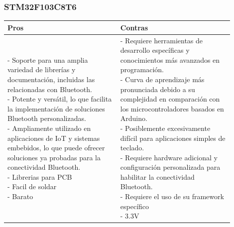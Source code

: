\subsubsection{STM32F103C8T6}
\begin{table}[H]
\centering
\small
\begin{tabular}{|p{0.45\linewidth}|p{0.45\linewidth}|}
\hline
\textbf{Pros} &
\textbf{Contras} \\
\hline
\parbox[t]{\linewidth}{
\vspace{0.1cm}
- Soporte para una amplia variedad de librerías y documentación, incluidas las relacionadas con \gls{Bluetooth}. \bigskip \\
- Potente y versátil, lo que facilita la implementación de soluciones \gls{Bluetooth} personalizadas. \bigskip \\
- Ampliamente utilizado en aplicaciones de \gls{IoT} y sistemas embebidos, lo que puede ofrecer soluciones ya probadas para la conectividad \gls{Bluetooth}. \bigskip \\
- Librerias para \gls{PCB} \bigskip \\
- Facil de soldar \bigskip \\
- Barato
} &
\parbox[t]{\linewidth}{
\vspace{0.1cm}
- Requiere herramientas de desarrollo específicas y conocimientos más avanzados en programación. \bigskip \\
- Curva de aprendizaje más pronunciada debido a su complejidad en comparación con los microcontroladores basados en Arduino. \bigskip \\
- Posiblemente excesivamente difícil para aplicaciones simples de teclado. \bigskip \\
- Requiere hardware adicional y configuración personalizada para habilitar la conectividad \gls{Bluetooth}. \bigskip \\
- Requiere el uso de su framework específico  \bigskip \\
- 3.3V} \bigskip \\
\hline
\end{tabular}
\end{table}

